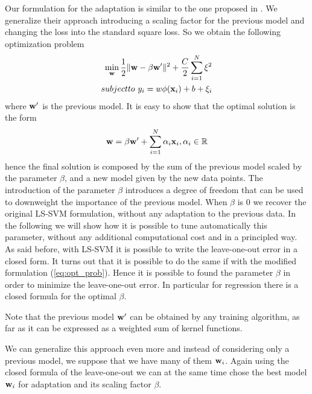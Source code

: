Our formulation for the adaptation is similar to the one proposed in
\cite{YangYH07}.
We generalize their approach introducing a scaling factor for the previous
model and changing the loss into the standard square loss.
So we obtain the following optimization problem
\begin{align}
\min_{\ww} \frac{1}{2} \|\ww- \beta \ww'\|^2 + \frac{C}{2} \sum_{i=1}^N \xi^2 \\
subject to \ y_i = w \phi(\xx_i) + b + \xi_i
\label{eq:opt_prob}
\end{align}
\noindent where $\mathbf{w}'$ is the previous model.
It is easy to show that the optimal solution is the form
\begin{equation}
\mathbf{w} = \beta \mathbf{w}' + \sum_{i=1}^N \alpha_i \mathbf{x}_i, \alpha_i \in \mathbb{R}
\end{equation}
\noindent hence the final solution is composed by the sum of the previous model
scaled by the parameter $\beta$, and a new model given by the new data points.
The introduction of the parameter $\beta$ introduces a degree of freedom that
can be used to downweight the importance of the previous model. When $\beta$
is $0$ we recover the original LS-SVM formulation, without any adaptation to
the previous data.
In the following we will show how it is possible to tune automatically this
parameter, without any additional computational cost and in a principled way.
As said before, with LS-SVM it is possible to write the leave-one-out error
in a closed form. It turns out that it is possible to do the same if with the
modified formulation (\ref{eq:opt_prob}). Hence it is possible to found the
parameter $\beta$ in order to minimize the leave-one-out error. In particular
for regression there is a closed formula for the optimal $\beta$.

Note that the previous model $\mathbf{w}'$ can be obtained by any training algorithm,
as far as it can be expressed as a weighted sum of kernel functions.

We can generalize this approach even more and instead of considering only a
previous model, we suppose that we have many of them $\mathbf{w}_i$. Again using the
closed formula of the leave-one-out we can at the same time chose the best
model $\mathbf{w}_i$ for adaptation and its scaling factor $\beta$.
